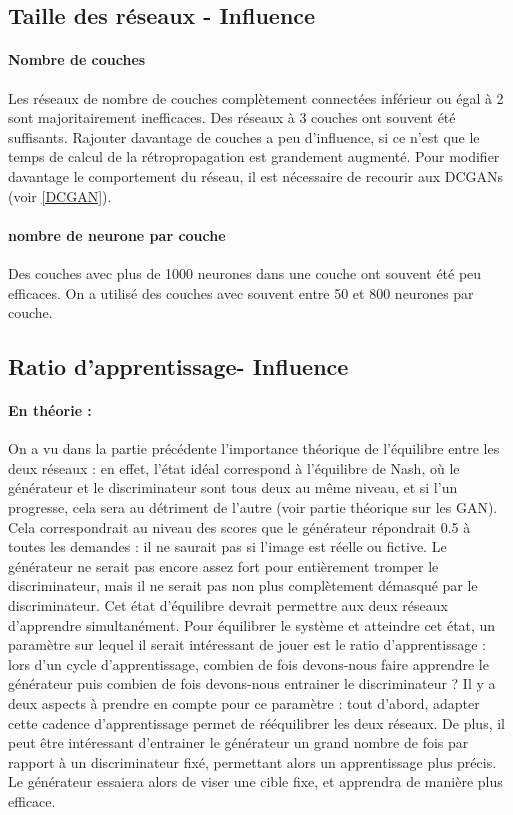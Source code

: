 \subsection{Taille des réseaux - Influence}
\paragraph{Nombre de couches}
Les réseaux de nombre de couches complètement connectées inférieur ou égal à 2 sont majoritairement inefficaces. Des réseaux à 3 couches ont souvent été suffisants. Rajouter davantage de couches a peu d'influence, si ce n'est que le temps de calcul de la rétropropagation est grandement augmenté. Pour modifier davantage le comportement du réseau, il est nécessaire de recourir aux DCGANs (voir \ref{DCGAN}).
\paragraph{nombre de neurone par couche}
Des couches avec plus de 1000 neurones dans une couche ont souvent été peu efficaces. On a utilisé des couches avec souvent entre 50 et 800 neurones par couche. 

\subsection{Ratio d'apprentissage- Influence}

\paragraph{En théorie :}
On a vu dans la partie précédente l'importance théorique de l'équilibre entre les deux réseaux : en effet, l'état idéal correspond à l'équilibre de Nash, où le générateur et le discriminateur sont tous deux au même niveau, et si l'un progresse, cela sera au détriment de l'autre (voir partie théorique sur les GAN). Cela correspondrait au niveau des scores que le générateur répondrait 0.5 à toutes les demandes : il ne saurait pas si l'image est réelle ou fictive. Le générateur ne serait pas encore assez fort pour entièrement tromper le discriminateur, mais il ne serait pas non plus complètement démasqué par le discriminateur. \newline
Cet état d'équilibre devrait permettre aux deux réseaux d'apprendre simultanément. Pour équilibrer le système et atteindre cet état, un paramètre sur lequel il serait intéressant de jouer est le ratio d'apprentissage : lors d'un cycle d'apprentissage, combien de fois devons-nous faire apprendre le générateur puis combien de fois devons-nous entrainer le discriminateur ? 
Il y a deux aspects à prendre en compte pour ce paramètre : tout d'abord, adapter cette cadence d'apprentissage permet de rééquilibrer les deux réseaux. De plus, il peut être intéressant d'entrainer le générateur un grand nombre de fois par rapport à un discriminateur fixé, permettant alors un apprentissage plus précis. Le générateur essaiera alors de viser une cible fixe, et apprendra de manière plus efficace.

